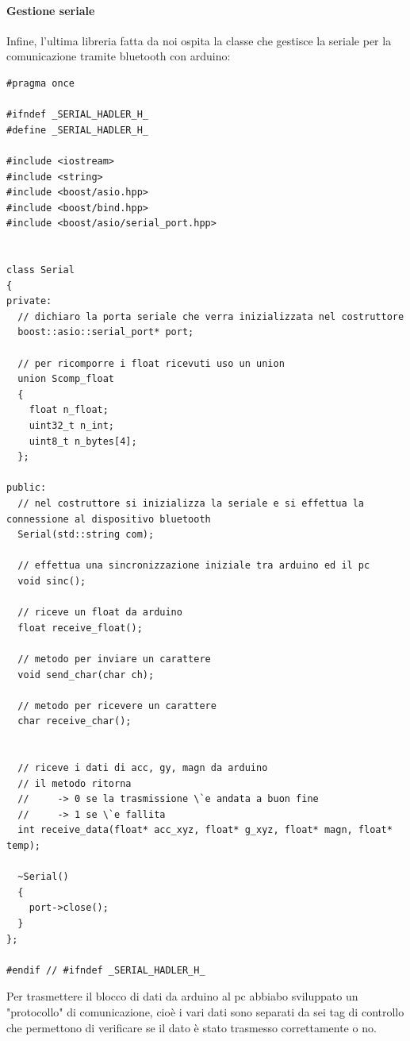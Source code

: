 \documentclass[10pt,a4paper]{article}
\begin{document}
\paragraph{Gestione seriale}
Infine, l'ultima libreria fatta da noi ospita la classe che gestisce la seriale per la comunicazione tramite bluetooth con arduino:
\begin{lstlisting}[style=mycpp, caption=serial.h, captionpos=b]
#pragma once

#ifndef _SERIAL_HADLER_H_
#define _SERIAL_HADLER_H_

#include <iostream>
#include <string>
#include <boost/asio.hpp> 
#include <boost/bind.hpp>
#include <boost/asio/serial_port.hpp> 


class Serial
{
private:
  // dichiaro la porta seriale che verra inizializzata nel costruttore
  boost::asio::serial_port* port;

  // per ricomporre i float ricevuti uso un union
  union Scomp_float
  {
    float n_float;
    uint32_t n_int;
    uint8_t n_bytes[4];
  };

public:
  // nel costruttore si inizializza la seriale e si effettua la connessione al dispositivo bluetooth
  Serial(std::string com);
  
  // effettua una sincronizzazione iniziale tra arduino ed il pc
  void sinc();

  // riceve un float da arduino
  float receive_float();

  // metodo per inviare un carattere
  void send_char(char ch);

  // metodo per ricevere un carattere
  char receive_char();


  // riceve i dati di acc, gy, magn da arduino
  // il metodo ritorna 
  //     -> 0 se la trasmissione \`e andata a buon fine
  //     -> 1 se \`e fallita
  int receive_data(float* acc_xyz, float* g_xyz, float* magn, float* temp);

  ~Serial()
  {
    port->close();
  }
};

#endif // #ifndef _SERIAL_HADLER_H_
\end{lstlisting}
Per trasmettere il blocco di dati da arduino al pc abbiabo sviluppato un "protocollo" di comunicazione, cio\`e i vari dati sono separati da sei tag di controllo che permettono di verificare se il dato \`e stato trasmesso correttamente o no.
\end{document}

